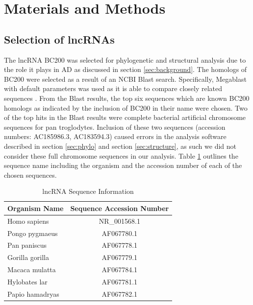 \documentclass[conference, 11pt]{IEEEtran}
\begin{document}
\section{Materials and Methods}\label{sec:methods}

\subsection{Selection of lncRNAs}\label{sec:lncRNA-selection}
The lncRNA BC200 was selected for phylogenetic and structural analysis due to the role it plays in AD as discussed in section \ref{sec:background}. 
The homologs of BC200 were selected as a result of an NCBI Blast \cite{blastTool} search. 
Specifically, Megablast \cite{morgulis2008database} with default parameters was used as it is able to compare closely related sequences \cite{amirmahani2018phylogenetic}. 
From the Blast results, the top six sequences which are known BC200 homologs as indicated by the inclusion of BC200 in their name were chosen. 
Two of the top hits in the Blast results were complete bacterial artificial chromosome sequences for pan troglodytes. 
Inclusion of these two sequences (accession numbers: AC185986.3, AC183594.3) caused errors in the analysis software described in section \ref{sec:phylo} and section \ref{sec:structure}, as such we did not consider these full chromosome sequences in our analysis. 
Table \ref{tbl:accession} outlines the sequence name including the organism and the accession number of each of the chosen sequences. 

\begin{table}[ht]
  \centering
  \caption{lncRNA Sequence Information}
  \label{tbl:accession}
  \begin{tabular}{lc}
    \toprule
    Organism Name & Sequence Accession Number \\
    \midrule
    Homo sapiens    & NR\_001568.1 \\
    Pongo pygmaeus  & AF067780.1 \\
    Pan paniscus    & AF067778.1 \\
    Gorilla gorilla & AF067779.1 \\
    Macaca mulatta  & AF067784.1 \\
    Hylobates lar   & AF067781.1 \\
    Papio hamadryas & AF067782.1 \\
    \bottomrule
  \end{tabular}
\end{table}
\end{document}
